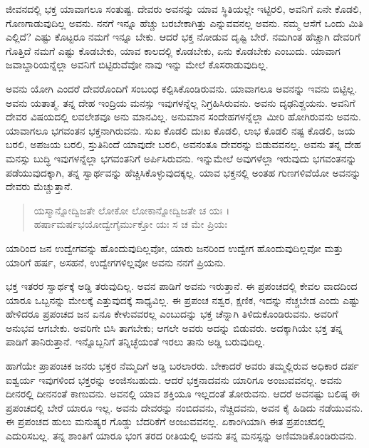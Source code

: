 ಜೀವನದಲ್ಲಿ ಭಕ್ತ ಯಾವಾಗಲೂ ಸಂತುಷ್ಟ. ದೇವರು ಅವನನ್ನು ಯಾವ ಸ್ಥಿತಿಯಲ್ಲೇ ಇಟ್ಟಿರಲಿ, ಅವನಿಗೆ ಏನೇ ಕೊಡಲಿ, ಗೊಣಗಾಡುವುದಿಲ್ಲ ಅವನು. ನನಗೆ ಇನ್ನೂ ಹೆಚ್ಚು ಬರಬೇಕಾಗಿತ್ತು ಎನ್ನುವವನಲ್ಲ ಅವನು. ನಮ್ಮ ಆಸೆಗೆ ಒಂದು ಮಿತಿ ಎಲ್ಲಿದೆ? ಎಷ್ಟು ಕೊಟ್ಟರೂ ನಮಗೆ ಇನ್ನೂ ಬೇಕು. ಆದರೆ ಭಕ್ತ ನೋಡುವ ದೃಷ್ಟಿ ಬೇರೆ. ನಮಗಿಂತ ಹೆಚ್ಚಾಗಿ ದೇವರಿಗೆ ಗೊತ್ತಿದೆ ನಮಗೆ ಎಷ್ಟು ಕೊಡಬೇಕು, ಯಾವ ಕಾಲದಲ್ಲಿ ಕೊಡಬೇಕು, ಏನು ಕೊಡಬೇಕು ಎಂಬುದು. ಯಾವಾಗ ಜವಾಬ್ದಾರಿಯನ್ನೆಲ್ಲಾ ಅವನಿಗೆ ಬಿಟ್ಟಿರುವೆವೋ ನಾವು ಇನ್ನು ಮೇಲೆ ಕೊಸರಾಡುವುದಿಲ್ಲ.

ಅವನು ಯೋಗಿ ಎಂದರೆ ದೇವರೊಂದಿಗೆ ಸಂಬಂಧ ಕಲ್ಪಿಸಿಕೊಂಡಿರುವನು. ಯಾವಾಗಲೂ ಅವನನ್ನು ಇವನು ಬಿಟ್ಟಿಲ್ಲ. ಅವನು ಯತಾತ್ಮ. ತನ್ನ ದೇಹ ಇಂದ್ರಿಯ ಮನಸ್ಸು ಇವುಗಳನ್ನೆಲ್ಲ ನಿಗ್ರಹಿಸಿರುವನು. ಅವನು ದೃಢನಿಶ್ಚಯನು. ಅವನಿಗೆ ದೇವರ ವಿಷಯದಲ್ಲಿ ಲವಲೇಶವೂ ಅನು ಮಾನವಿಲ್ಲ. ಅನುಮಾನ ಸಂದೇಹಗಳನ್ನೆಲ್ಲಾ ಮೀರಿ ಹೋಗಿರುವನು ಅವನು. ಯಾವಾಗಲೂ ಭಗವಂತನ ಭಕ್ತನಾಗಿರುವನು. ಸುಖ ಕೊಡಲಿ ದುಃಖ ಕೊಡಲಿ, ಲಾಭ ಕೊಡಲಿ ನಷ್ಟ ಕೊಡಲಿ, ಜಯ ಬರಲಿ, ಅಪಜಯ ಬರಲಿ, ಸ್ತುತಿನಿಂದೆ ಯಾವುದೇ ಬರಲಿ, ಅವನಂತೂ ದೇವರನ್ನು ಬಿಡುವವನಲ್ಲ. ಅವನು ತನ್ನ ದೇಹ ಮನಸ್ಸು ಬುದ್ಧಿ ಇವುಗಳನ್ನೆಲ್ಲಾ ಭಗವಂತನಿಗೆ ಅರ್ಪಿಸಿರುವನು. ಇನ್ನುಮೇಲೆ ಅವುಗಳೆಲ್ಲಾ ಇರುವುದು ಭಗವಂತನನ್ನು ಪಡೆಯುವುದಕ್ಕಾಗಿ, ತನ್ನ ಸ್ವಾರ್ಥವನ್ನು ಹೆಚ್ಚಿಸಿಕೊಳ್ಳುವುದಕ್ಕಲ್ಲ. ಯಾವ ಭಕ್ತನಲ್ಲಿ ಅಂತಹ ಗುಣಗಳಿವೆಯೋ ಅವನನ್ನು ದೇವರು ಮೆಚ್ಚುತ್ತಾನೆ.

\begin{verse}
ಯಸ್ಮಾನ್ನೋದ್ವಿಜತೇ ಲೋಕೋ ಲೋಕಾನ್ನೋದ್ವಿಜತೇ ಚ ಯಃ ।\\ಹರ್ಷಾಮರ್ಷಭಯೋದ್ವೇಗೈರ್ಮುಕ್ತೋ ಯಃ ಸ ಚ ಮೇ ಪ್ರಿಯಃ 
\end{verse}

{\small ಯಾರಿಂದ ಜನ ಉದ್ವೇಗವನ್ನು ಹೊಂದುವುದಿಲ್ಲವೋ, ಯಾರು ಜನರಿಂದ ಉದ್ವೇಗ ಹೊಂದುವುದಿಲ್ಲವೋ ಮತ್ತು ಯಾರಿಗೆ ಹರ್ಷ, ಅಸಹನೆ, ಉದ್ವೇಗಗಳಿಲ್ಲವೋ ಅವನು ನನಗೆ ಪ್ರಿಯನು.}

ಭಕ್ತ ಇತರರ ಸ್ವಾರ್ಥಕ್ಕೆ ಅಡ್ಡಿ ತರುವುದಿಲ್ಲ. ಅವನ ಪಾಡಿಗೆ ಅವನು ಇರುತ್ತಾನೆ. ಈ ಪ್ರಪಂಚದಲ್ಲಿ ಕೇವಲ ವಾದದಿಂದ ಯಾರೂ ಒಬ್ಬನನ್ನು ಮೇಲಕ್ಕೆ ಎತ್ತುವುದಕ್ಕೆ ಸಾಧ್ಯವಿಲ್ಲ. ಈ ಪ್ರಪಂಚ ನಶ್ವರ, ಕ್ಷಣಿಕ, ಇದನ್ನು ನೆಚ್ಚಬೇಡ ಎಂದು ಎಷ್ಟು ಹೇಳಿದರೂ ಪ್ರಪಂಚದ ಜನ ಏನೂ ಕೇಳುವವರಲ್ಲ ಎಂಬುದನ್ನು ಭಕ್ತ ಚೆನ್ನಾಗಿ ತಿಳಿದುಕೊಂಡಿರುವನು. ಅವರಿಗೆ ಅನುಭವ ಆಗಬೇಕು. ಅವರಿಗೇ ಬಿಸಿ ತಾಗಬೇಕು; ಆಗಲೇ ಅವರು ಅದನ್ನು ಬಿಡುವರು. ಅದಕ್ಕಾಗಿಯೇ ಭಕ್ತ ತನ್ನ ಪಾಡಿಗೆ ತಾನಿರುತ್ತಾನೆ. ಇನ್ನೊಬ್ಬನಿಗೆ ತನ್ನಿಚ್ಛೆಯಂತೆ ಇರಲು ತಾನು ಅಡ್ಡಿ ಬರುವುದಿಲ್ಲ.

ಹಾಗೆಯೇ ಪ್ರಾಪಂಚಿಕ ಜನರು ಭಕ್ತರ ನೆಮ್ಮದಿಗೆ ಅಡ್ಡಿ ಬರಲಾರರು. ಬೇಕಾದರೆ ಅವರು ತಮ್ಮಲ್ಲಿರುವ ಅಧಿಕಾರ ದರ್ಪ ಐಶ್ವರ್ಯ ಇವುಗಳಿಂದ ಭಕ್ತರನ್ನು ಅಂಜಿಸಬಹುದು. ಆದರೆ ಭಕ್ತನಾದವನು ಯಾರಿಗೂ ಅಂಜುವವನಲ್ಲ. ಅವನು ದೀನರಲ್ಲಿ ದೀನನಂತೆ ಕಾಣುವನು. ಅವನಲ್ಲಿ ಯಾವ ಶಕ್ತಿಯೂ ಇಲ್ಲದಂತೆ ತೋರುವನು. ಆದರೆ ಅವನಷ್ಟು ಬಲಿಷ್ಠ ಈ ಪ್ರಪಂಚದಲ್ಲಿ ಬೇರೆ ಯಾರೂ ಇಲ್ಲ. ಅವನು ದೇವರನ್ನು ನಂಬಿದವನು, ನೆಚ್ಚಿದವನು, ಅವನ ಕೈ ಹಿಡಿದು ನಡೆಯುವನು. ಈ ಪ್ರಪಂಚದ ಹುಲು ಮನುಷ್ಯರ ಗೊಡ್ಡು ಬೆದರಿಕೆಗೆ ಅಂಜುವವನಲ್ಲ. ಏಕಾಂಗಿಯಾಗಿ ಈತ ಪ್ರಪಂಚದಲ್ಲಿ ಎದುರಿಸಬಲ್ಲ. ತನ್ನ ಶಾಂತಿಗೆ ಯಾರೂ ಭಂಗ ತರದ ರೀತಿಯಲ್ಲಿ ಅವನು ತನ್ನ ಮನಸ್ಸನ್ನು ಅಣಿಮಾಡಿಕೊಂಡಿರುವನು.

